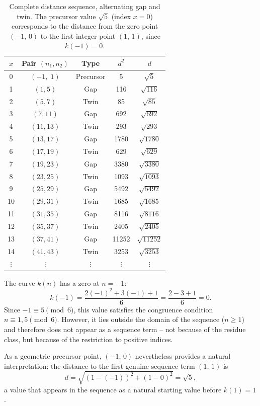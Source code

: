 \begin{table}[H]
\centering
\caption{Complete distance sequence, alternating gap and twin.
  The precursor value $\sqrt{5}$ (index $x=0$) corresponds to the distance
  from the zero point $(-1,\,0)$ to the first integer point $(1,\,1)$,
  since $k(-1) = 0$.}
\renewcommand{\arraystretch}{1.15}
\begin{tabular}{ccccc}
\toprule
$x$ & Pair $(n_1,n_2)$ & Type & $d^2$ & $d$ \\
\midrule
0 & $(-1,\; 1)$ & Precursor & $5$ & $\sqrt{5}$ \\
\midrule
1  & $( 1,  5)$ & Gap  & 116   & $\sqrt{116}$   \\
2  & $( 5,  7)$ & Twin & 85    & $\sqrt{85}$    \\
3  & $( 7, 11)$ & Gap  & 692   & $\sqrt{692}$   \\
4  & $(11, 13)$ & Twin & 293   & $\sqrt{293}$   \\
5  & $(13, 17)$ & Gap  & 1780  & $\sqrt{1780}$  \\
6  & $(17, 19)$ & Twin & 629   & $\sqrt{629}$   \\
7  & $(19, 23)$ & Gap  & 3380  & $\sqrt{3380}$  \\
8  & $(23, 25)$ & Twin & 1093  & $\sqrt{1093}$  \\
9  & $(25, 29)$ & Gap  & 5492  & $\sqrt{5492}$  \\
10 & $(29, 31)$ & Twin & 1685  & $\sqrt{1685}$  \\
11 & $(31, 35)$ & Gap  & 8116  & $\sqrt{8116}$  \\
12 & $(35, 37)$ & Twin & 2405  & $\sqrt{2405}$  \\
13 & $(37, 41)$ & Gap  & 11252 & $\sqrt{11252}$ \\
14 & $(41, 43)$ & Twin & 3253  & $\sqrt{3253}$  \\
$\vdots$ & $\vdots$ & $\vdots$ & $\vdots$ & $\vdots$ \\
\bottomrule
\end{tabular}
\end{table}

\begin{bemerkung}
	The curve $k(n)$ has a zero at $n = -1$:
	\[
	k(-1) = \frac{2(-1)^2 + 3(-1) + 1}{6} = \frac{2 - 3 + 1}{6} = 0.
	\]
	Since $-1 \equiv 5 \pmod{6}$, this value satisfies the congruence condition
	$n \equiv 1, 5 \pmod{6}$. However, it lies outside the
	domain of the sequence ($n \geq 1$) and therefore does not appear
	as a sequence term -- not because of the residue class, but because of the
	restriction to positive indices.
	
	As a geometric precursor point, $(-1,\, 0)$ nevertheless provides a
	natural interpretation: the distance to the first genuine sequence term
	$(1,\, 1)$ is
	\[
	d = \sqrt{(1-(-1))^2 + (1-0)^2} = \sqrt{5},
	\]
	a value that appears in the sequence as a natural starting value before $k(1) = 1$.
\end{bemerkung}

